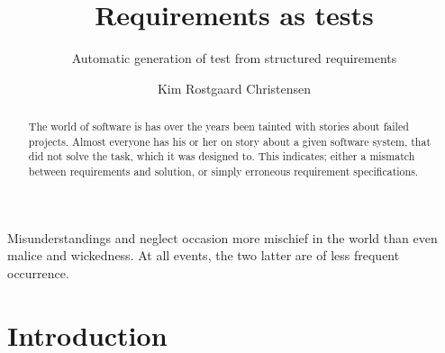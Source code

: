 \documentclass[10pt]{scrreprt}
\author{Kim Rostgaard Christensen}
\title{Requirements as tests}
\subtitle{Automatic generation of test from structured requirements}
\begin{document}
\maketitle
 
\tableofcontents

\begin{fquote}Misunderstandings and neglect occasion more mischief in the world than even malice and wickedness. At all events, the two latter are of less frequent occurrence.
\end{fquote}
\begin{abstract}
The world of software is has over the years been tainted with stories about failed projects. Almost everyone has his or her on story about a given software system, that did not solve the task, which it was designed to. This indicates; either a mismatch between requirements and solution, or simply erroneous requirement specifications.
\end{abstract}

\chapter{Introduction}


\end{document}
